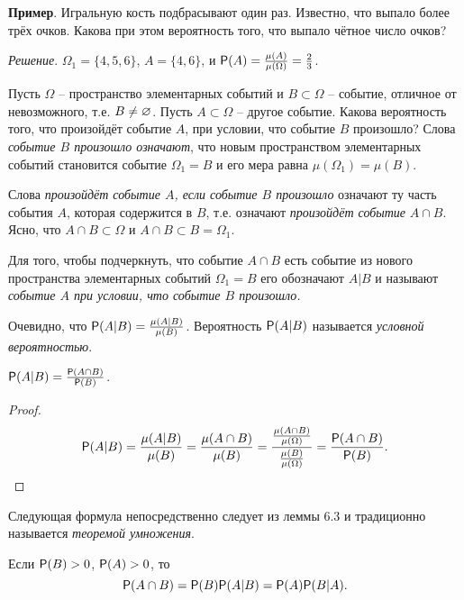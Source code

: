 \textbf{Пример}. Игральную кость подбрасывают один раз. Известно, что выпало более трёх очков. Какова при этом вероятность того, что выпало чётное число очков?

\textit{Решение}. $\Omega_1 = \{4, 5, 6\}$, $A = \{4, 6\}$, и $\P(A) = \frac{\mu(A)}{ \mu(\Omega)} = \frac{2}{3}$.

\begin{zam}
\label{zam:6.1}
Пусть $\Omega$ -- пространство элементарных событий и $B \subset \Omega$ -- событие, отличное от невозможного, т.е. $B \ne \noo$. 
Пусть $A \subset \Omega$ – другое событие. Какова вероятность того, что произойдёт событие $A$, при условии,
что событие $B$ произошло? Слова \textit{событие $B$ произошло означают}, что новым пространством элементарных событий становится событие $\Omega_1 = B$ и его мера равна $\mu(\Omega_1 ) = \mu(B)$. 

Слова \textit{произойдёт событие $A$, если событие $B$
произошло} означают ту часть события $A$, которая содержится в $B$, т.е. означают \textit{произойдёт событие} $A \cap B$. Ясно, что $A \cap B \subset \Omega$ и $A \cap B \subset B = \Omega_1$.
\end{zam}

\begin{definition}
\label{def:6.2}
Для того, чтобы подчеркнуть, что событие $A \cap B$ есть
событие из нового пространства элементарных событий $\Omega_1 = B$ его обозначают $A|B$ и называют \textit{событие $A$ при условии, что событие $B$ произошло.}

Очевидно, что $\P(A|B)=\frac{\mu(A|B)}{\mu(B)}$. Вероятность $\P(A|B)$ называется \textit{условной вероятностью}.
\end{definition}

\begin{lemma}
\label{lemma:6.3}
	$\P(A|B) = \frac{\P(A\cap B)}{\P(B)}$.
\end{lemma}

\begin{proof}
\begin{equation*}
	\P(A|B) = \frac{\mu(A|B)}{\mu(B)}=\frac{\mu(A\cap B)}{\mu(B)}
=\frac{\frac{\mu(A\cap B)}{\mu(\Omega)}}{\frac{\mu(B)}{\mu(\Omega)}}
=\frac{\P(A\cap B)}{\P(B)}.
\end{equation*}	
\end{proof}

Следующая формула непосредственно следует из леммы 6.3 и традиционно называется \textit{теоремой умножения}.

\begin{theorem}
\label{th:6.4}
Если $\P(B) > 0$, $\P(A) > 0$, то
\begin{equation*}
	\P(A \cap B) = \P(B)\P(A|B) = \P(A)\P(B|A).
\end{equation*}
\end{theorem}

